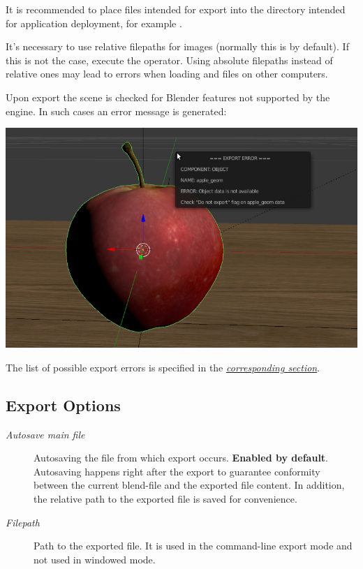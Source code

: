 \documentclass[a4paper,12pt,oneside]{sphinxmanual}
\begin{document}
It is recommended to place files intended for export into the directory intended for application deployment, for example .

It's necessary to use relative filepaths for images (normally this is by default). If this is not the case, execute the  operator. Using absolute filepaths instead of relative ones may lead to errors when loading  and  files on other computers.

Upon export the scene is checked for Blender features not supported by the engine. In such cases an error message is generated:

{\hfill\includegraphics[width=1.000\linewidth]{error_message.jpg}\hfill}

\begin{DUlineblock}{0em}
\item[] 
\end{DUlineblock}

The list of possible export errors is specified in the {\hyperref[addon:export-errors]{\emph{corresponding section}}}.


\subsection{Export Options}
\label{workflow:id4}\begin{description}
\item[{\emph{Autosave main file}}] \leavevmode
Autosaving the file from which export occurs. \textbf{Enabled by default}. Autosaving happens right after the export to guarantee conformity between the current blend-file and the exported file content. In addition, the relative path to the exported file is saved for convenience.

\item[{\emph{Filepath}}] \leavevmode
Path to the exported file. It is used in the command-line export mode and not used in windowed mode.

\end{description}
\end{document}
